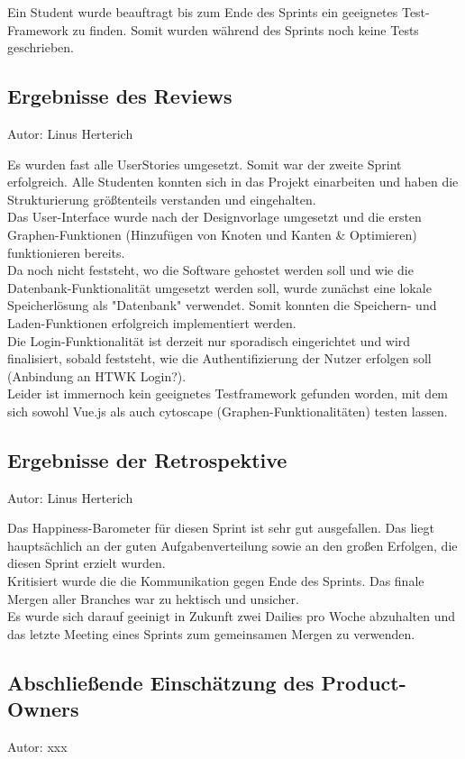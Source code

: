 Ein Student wurde beauftragt bis zum Ende des Sprints ein geeignetes Test-Framework zu finden.
Somit wurden während des Sprints noch keine Tests geschrieben.

\subsection{Ergebnisse des Reviews}
{\small Autor: Linus Herterich}

Es wurden fast alle UserStories umgesetzt. Somit war der zweite Sprint erfolgreich.
Alle Studenten konnten sich in das Projekt einarbeiten und haben die Strukturierung
größtenteils verstanden und eingehalten.
\\ Das User-Interface wurde nach der Designvorlage umgesetzt und die ersten Graphen-Funktionen
(Hinzufügen von Knoten und Kanten \& Optimieren) funktionieren bereits.
\\ Da noch nicht feststeht, wo die Software gehostet werden soll und wie die Datenbank-Funktionalität
umgesetzt werden soll, wurde zunächst eine lokale Speicherlösung als "Datenbank" verwendet. Somit konnten
die Speichern- und Laden-Funktionen erfolgreich implementiert werden.
\\ Die Login-Funktionalität ist derzeit nur sporadisch eingerichtet und wird finalisiert,
sobald feststeht, wie die Authentifizierung der Nutzer erfolgen soll (Anbindung an HTWK Login?).
\\ Leider ist immernoch kein geeignetes Testframework gefunden worden, mit dem sich sowohl Vue.js
als auch cytoscape (Graphen-Funktionalitäten) testen lassen.

\subsection{Ergebnisse der Retrospektive}
{\small Autor: Linus Herterich}

Das Happiness-Barometer für diesen Sprint ist sehr gut ausgefallen. Das liegt hauptsächlich an der guten Aufgabenverteilung
sowie an den großen Erfolgen, die diesen Sprint erzielt wurden.
\\ Kritisiert wurde die die Kommunikation gegen Ende des Sprints. Das finale Mergen aller Branches war zu hektisch und unsicher.
\\ Es wurde sich darauf geeinigt in Zukunft zwei Dailies pro Woche abzuhalten und das letzte Meeting eines Sprints zum gemeinsamen Mergen zu verwenden.

\subsection{Abschließende Einschätzung des Product-Owners}
{\small Autor: xxx}

